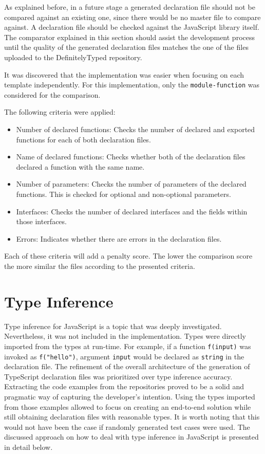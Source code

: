 As explained before, in a future stage a generated declaration file should not be compared against an existing one, since there would be no master file to compare against. A declaration file should be checked against the JavaScript library itself. The comparator explained in this section should assist the development process until the quality of the generated declaration files matches the one of the files uploaded to the DefinitelyTyped repository.

It was discovered that the implementation was easier when focusing on each template independently. For this implementation, only the \texttt{module-function} was considered for the comparison.

The following criteria were applied:
\begin{itemize}
  \item Number of declared functions: Checks the number of declared and exported functions for each of both declaration files.
  \item Name of declared functions: Checks whether both of the declaration files declared a function with the same name.
  \item Number of parameters: Checks the number of parameters of the declared functions. This is checked for optional and non-optional parameters.
  \item Interfaces: Checks the number of declared interfaces and the fields within those interfaces.
  \item Errors: Indicates whether there are errors in the declaration files.
\end{itemize}

Each of these criteria will add a penalty score. The lower the comparison score the more similar the files according to the presented criteria.

\section{Type Inference} \label{sec:approach-type-inference}
Type inference for JavaScript is a topic that was deeply investigated. Nevertheless, it was not included in the implementation. Types were directly imported from the types at run-time. For example, if a function \texttt{f(input)} was invoked as \texttt{f("hello")}, argument \texttt{input} would be declared as \texttt{string} in the declaration file.
The refinement of the overall architecture of the generation of TypeScript declaration files was prioritized over type inference accuracy. Extracting the code examples from the repositories proved to be a solid and pragmatic way of capturing the developer's intention. Using the types imported from those examples allowed to focus on creating an end-to-end solution while still obtaining declaration files with reasonable types. It is worth noting that this would not have been the case if randomly generated test cases were used.
The discussed approach on how to deal with type inference in JavaScript is presented in detail below.

